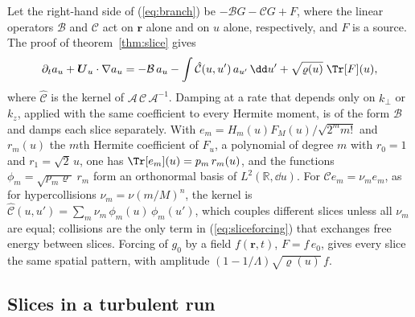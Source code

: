 Let the right-hand side of (\ref{eq:branch}) be $-\mathcal BG-\mathcal CG+F$, where the linear operators $\mathcal B$ and $\mathcal C$ act on $\boldsymbol r$ alone and on $u$ alone, respectively, and $F$ is a source. The proof of theorem~\ref{thm:slice} gives
\begin{equation}\label{eq:sliceforcing}
  \partial_ta_u+\boldsymbol U_u\cdot\nabla a_u=-\mathcal B\,a_u-\int\hat{\mathcal C}(u,u')\,a_{u'}\,\dd u'+\sqrt{\varrho(u)}\;\Tr[F](u),
\end{equation}
where $\hat{\mathcal C}$ is the kernel of $\mathcal A\,\mathcal C\,\mathcal A^{-1}$. Damping at a rate that depends only on $k_\perp$ or $k_z$, applied with the same coefficient to every Hermite moment, is of the form $\mathcal B$ and damps each slice separately. With $e_m=H_m(u)F_M(u)/\sqrt{2^mm!}$ and $r_m(u)$ the $m$th Hermite coefficient of $F_u$, a polynomial of degree $m$ with $r_0=1$ and $r_1=\sqrt2\,u$, one has $\Tr[e_m](u)=p_m\,r_m(u)$, and the functions $\phi_m=\sqrt{p_m\varrho}\;r_m$ form an orthonormal basis of $L^2(\mathbb R,\dd u)$. For $\mathcal Ce_m=\nu_me_m$, as for hypercollisions $\nu_m=\nu(m/M)^n$, the kernel is $\hat{\mathcal C}(u,u')=\sum_m\nu_m\,\phi_m(u)\,\phi_m(u')$, which couples different slices unless all $\nu_m$ are equal; collisions are the only term in (\ref{eq:sliceforcing}) that exchanges free energy between slices. Forcing of $g_0$ by a field $f(\boldsymbol r,t)$, $F=f\,e_0$, gives every slice the same spatial pattern, with amplitude $(1-1/\Lambda)\sqrt{\varrho(u)}\,f$.

\subsection{Slices in a turbulent run}\label{sl:snapshots}

